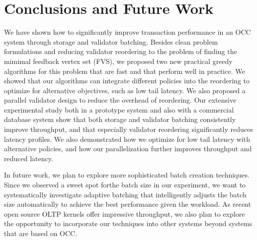 \section{Conclusions and Future Work}\label{sec:conclusion}

We have shown how to significantly improve transaction performance in an OCC system through storage and validator batching. Besides clean problem formulations and
reducing validator reordering to the problem of finding the mimimal feedback vertex set (FVS), we proposed two new practical greedy algorithms for this problem
that are fast and that perform well in practice. We showed that our algorithms can integrate different policies into the reordering to optimize for alternative objectives, 
such as low tail latency. We also proposed a parallel validator design to reduce the overhead of reordering. Our extensive experimental study both in a prototype system and also with a commercial database system show that both storage and validator batching consistently improve throughput, and that especially validator reordering 
significantly reduces latency profiles. We also demonstrated how we optimize for low tail latency with alternative policies, and how our parallelization further improves
throughput and reduced latency.

In future work, we plan to explore more sophisticated batch creation techniques. Since we observed a sweet spot forthe  batch size in our experiment, we want to systematically investigate adaptive batching that intelligently adjusts the batch size automatically to achieve the best performance given the workload. As recent open source OLTP kernels offer impressive throughput, we also plan to explore the opportunity to incorporate our techniques into other systems beyond systems that are based on OCC.
